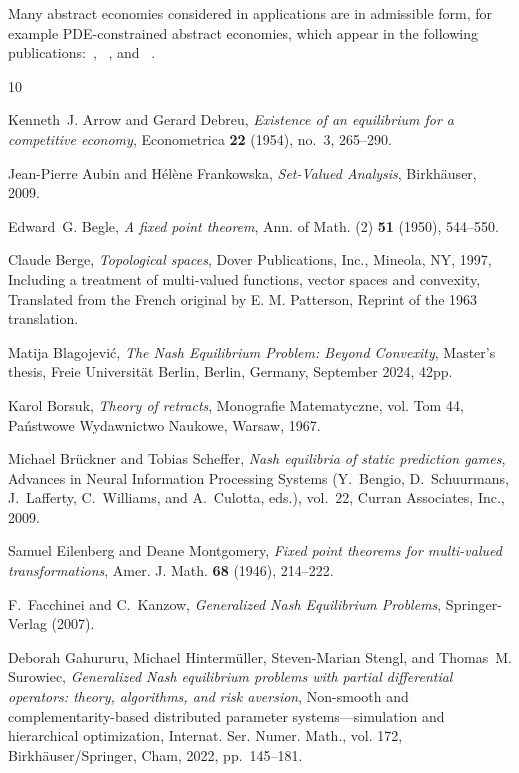 \documentclass[a4paper,11pt,reqno,english]{amsart}
\theoremstyle{definition}
\begin{document}
Many abstract economies considered in applications are in admissible form, for example PDE-constrained abstract economies, which appear in the following publications:~\cite{Hintermueller2015}, ~\cite{SurowiecStaudiglKouri2023}, and ~\cite{Hintermueller2022}.

\begin{thebibliography}{10}

	Kenneth~J. Arrow and Gerard Debreu, \emph{Existence of an equilibrium for a competitive economy}, Econometrica \textbf{22} (1954), no.~3, 265--290.

	Jean-Pierre Aubin and H\'{e}l\`{e}ne Frankowska, \emph{{Set-Valued Analysis}}, Birkh\"{a}user, 2009.

	Edward~G. Begle, \emph{A fixed point theorem}, Ann. of Math. (2) \textbf{51} (1950), 544--550.

	Claude Berge, \emph{Topological spaces}, Dover Publications, Inc., Mineola, NY, 1997, Including a treatment of multi-valued functions, vector spaces and convexity, Translated from the French original by E. M. Patterson, Reprint of the 1963 translation.

	Matija Blagojevi\'c, \emph{{The Nash Equilibrium Problem: Beyond Convexity}}, Master's thesis, Freie Universit\"at Berlin, Berlin, Germany, September 2024, 42pp.

	Karol Borsuk, \emph{Theory of retracts}, Monografie Matematyczne, vol. Tom 44, Pa\'nstwowe Wydawnictwo Naukowe, Warsaw, 1967.

	Michael Br\"{u}ckner and Tobias Scheffer, \emph{Nash equilibria of static prediction games}, Advances in Neural Information Processing Systems (Y.~Bengio, D.~Schuurmans, J.~Lafferty, C.~Williams, and A.~Culotta, eds.), vol.~22, Curran Associates, Inc., 2009.

	Samuel Eilenberg and Deane Montgomery, \emph{Fixed point theorems for multi-valued transformations}, Amer. J. Math. \textbf{68} (1946), 214--222.

	F.~Facchinei and C.~Kanzow, \emph{{Generalized Nash Equilibrium Problems}}, Springer-Verlag (2007).

	Deborah Gahururu, Michael Hinterm\"uller, Steven-Marian Stengl, and Thomas~M. Surowiec, \emph{Generalized {N}ash equilibrium problems with partial differential operators: theory, algorithms, and risk aversion}, Non-smooth and complementarity-based distributed parameter systems---simulation and hierarchical optimization, Internat. Ser. Numer. Math., vol. 172, Birkh\"auser/Springer, Cham, 2022, pp.~145--181.


\end{thebibliography}
\end{document}

